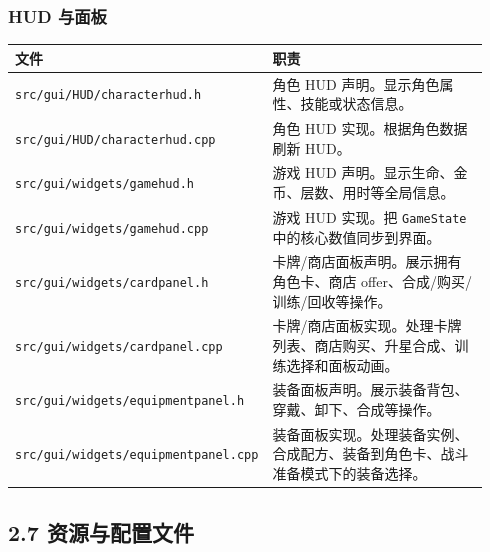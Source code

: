 \documentclass[UTF8,10pt]{ctexart}
\begin{document}
\subsubsection*{HUD 与面板}

{\small
\begin{longtable}{p{0.34\linewidth}p{0.60\linewidth}}
\toprule
\textbf{文件} & \textbf{职责} \\
\midrule
\texttt{src/\allowbreak{}gui/\allowbreak{}HUD/\allowbreak{}characterhud.\allowbreak{}h} & 角色 HUD 声明。显示角色属性、技能或状态信息。 \\
\texttt{src/\allowbreak{}gui/\allowbreak{}HUD/\allowbreak{}characterhud.\allowbreak{}cpp} & 角色 HUD 实现。根据角色数据刷新 HUD。 \\
\texttt{src/\allowbreak{}gui/\allowbreak{}widgets/\allowbreak{}gamehud.\allowbreak{}h} & 游戏 HUD 声明。显示生命、金币、层数、用时等全局信息。 \\
\texttt{src/\allowbreak{}gui/\allowbreak{}widgets/\allowbreak{}gamehud.\allowbreak{}cpp} & 游戏 HUD 实现。把 \texttt{GameState} 中的核心数值同步到界面。 \\
\texttt{src/\allowbreak{}gui/\allowbreak{}widgets/\allowbreak{}cardpanel.\allowbreak{}h} & 卡牌/商店面板声明。展示拥有角色卡、商店 offer、合成/购买/训练/回收等操作。 \\
\texttt{src/\allowbreak{}gui/\allowbreak{}widgets/\allowbreak{}cardpanel.\allowbreak{}cpp} & 卡牌/商店面板实现。处理卡牌列表、商店购买、升星合成、训练选择和面板动画。 \\
\texttt{src/\allowbreak{}gui/\allowbreak{}widgets/\allowbreak{}equipmentpanel.\allowbreak{}h} & 装备面板声明。展示装备背包、穿戴、卸下、合成等操作。 \\
\texttt{src/\allowbreak{}gui/\allowbreak{}widgets/\allowbreak{}equipmentpanel.\allowbreak{}cpp} & 装备面板实现。处理装备实例、合成配方、装备到角色卡、战斗准备模式下的装备选择。 \\
\bottomrule
\end{longtable}
}

\subsection*{2.7 资源与配置文件}
\end{document}
